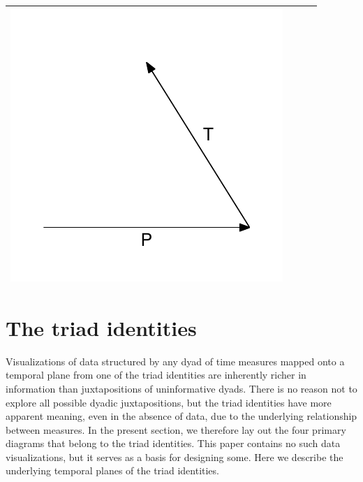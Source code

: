 \documentclass[11pt,oneside,a4paper]{article} %
\begin{document}
\begin{center}
\begin{longtable}{m{}m{}m{}m{}}
  \includegraphics[width = \linewidth]{Figures/JonasTable/TP_iso.pdf}  \\
  \bottomrule
  \end{longtable}
\end{center}



\section*{The triad identities}
Visualizations of data structured by any dyad of time measures mapped onto a
temporal plane from one of the triad identities are inherently richer in
information than juxtapositions of uninformative dyads. There is no reason not
to explore all possible dyadic juxtapositions, but the triad identities have more
apparent meaning, even in the absence of data, due to the underlying
relationship between measures. In the present section, we therefore lay out the
four primary diagrams that belong to the triad identities. This paper contains
no such data visualizations, but it serves as a basis for designing some. Here
we describe the underlying temporal planes of the triad identities.
\end{document}

